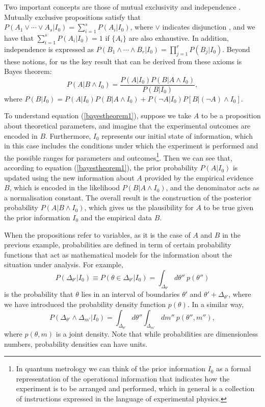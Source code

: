 Two important concepts are those of mutual exclusivity and independence \cite{jaynes2003}. Mutually exclusive propositions satisfy that $P(A_1 \lor \cdots \lor A_s | I_0) = \sum_{i=1}^s P(A_i | I_0)$, where $\lor$ indicates disjunction \cite{nidditch1962, copi2016}, and we have that $\sum_{i=1}^s P(A_i | I_0) = 1$ if $\lbrace A_i \rbrace$ are also exhaustive. In addition, independence is expressed as $P(B_1 \land \cdots \land B_r | I_0) = \prod_{j=1}^r P(B_j | I_0)$. Beyond these notions, for us the key result that can be derived from these axioms is Bayes theorem: 
\begin{equation}
P(A | B \land I_0) = \frac{P(A | I_0) P(B | A \land I_0)}{P(B | I_0)},
\label{bayestheorem1}
\end{equation}
where $P(B | I_0) = P(A | I_0 ) P(B |A  \land I_0 ) + P(\neg A | I_0 ) P[B |(\neg A) \land I_0]$. 

To understand equation (\ref{bayestheorem1}), suppose we take $A$ to be a proposition about theoretical parameters, and imagine that the experimental outcomes are encoded in $B$. Furthermore, $I_0$ represents our initial state of information, which in this case includes the conditions under which the experiment is performed and the possible ranges for parameters and outcomes\footnote{In quantum metrology we can think of the prior information $I_0$ as a formal representation of the operational information that indicates how the experiment is to be arranged and performed, which in general is a collection of instructions expressed in the language of experimental physics.}. Then we can see that, according to equation (\ref{bayestheorem1}), the prior probability $P(A | I_0)$ is updated using the new information about $A$ provided by the empirical evidence $B$, which is encoded in the likelihood $P(B | A \land I_0)$, and the denominator acts as a normalisation constant. The overall result is the construction of the posterior probability $P(A | B \land I_0)$, which gives us the plausibility for $A$ to be true given the prior information $I_0$ and the empirical data $B$. 

When the propositions refer to variables, as it is the case of $A$ and $B$ in the previous example, probabilities are defined in term of certain probability functions that act as mathematical models for the information about the situation under analysis. For example, 
\begin{equation}
P(\Delta_{\theta'}| I_0) \equiv P(\theta \in \Delta_{\theta'}| I_0) = \int_{\Delta_{\theta'}} d\theta'' ~p(\theta'') 
\label{cont1}
\end{equation}
is the probability that $\theta$ lies in an interval of boundaries $\theta'$ and $\theta' + \Delta_{\theta'}$, where we have introduced the probability density function $p(\theta)$. In a similar way,
\begin{equation}
P( \Delta_{\theta'} \land \Delta_{m'} | I_0 ) = \int_{\Delta_{\theta'}} d\theta'' \int_{\Delta_{m'}} dm''~p(\theta'', m''),
\label{cont2}
\end{equation}
where $p(\theta, m)$ is a joint density. Note that while probabilities are dimensionless numbers, probability densities can have units.  


